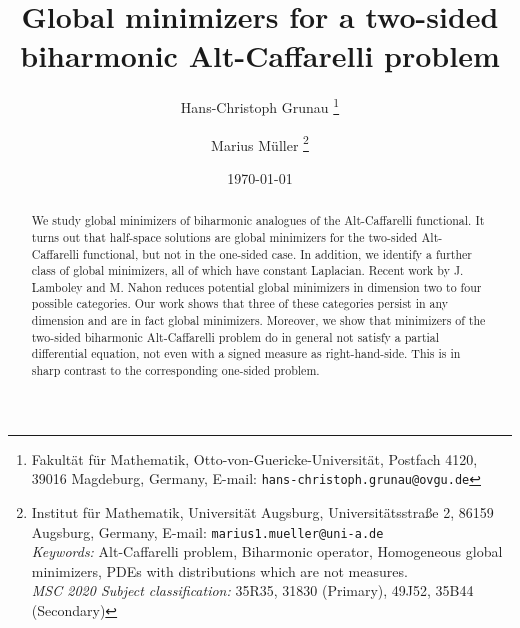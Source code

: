 \documentclass[twoside,11pt]{article}
\title{
Global minimizers for  a two-sided biharmonic 
Alt-Caffarelli 
problem
}
\author{Hans-Christoph Grunau
\thanks{Fakult\"{a}t f\"{u}r Mathematik, 
Otto-von-Guericke-Universit\"{a}t,
Postfach 4120,
39016 Magdeburg, Germany,
E-mail: \texttt{hans-christoph.grunau@ovgu.de}}
\and 
Marius M\"uller
\thanks{Institut f\"ur Mathematik, Universit\"at Augsburg,
	Universit\"atsstra{\ss}e 2,
	86159 Augsburg, Germany,
E-mail: \texttt{marius1.mueller@uni-a.de}
 \\
 \emph{Keywords:} 
Alt-Caffarelli problem, Biharmonic operator, Homogeneous global minimizers, PDEs with distributions which are not measures. 
 \\
 \emph{MSC 2020 Subject classification:} 35R35, 31830 (Primary), 49J52, 35B44 (Secondary)
 }%
}
\date{\today}
\theoremstyle{definition}
\begin{document}
\maketitle

\begin{abstract}
    We study global minimizers of biharmonic analogues of the Alt-Caffarelli functional. It turns out that half-space solutions are global minimizers for the two-sided Alt-Caffarelli functional, but not in the one-sided case. In addition, we identify a further class of global minimizers, all of which have constant Laplacian. Recent work by J. Lamboley and M. Nahon reduces potential global minimizers in dimension two to four possible categories.
    Our work shows that three of these categories persist in any dimension and are in fact global minimizers. 
\newline   
Moreover, we show that minimizers of the two-sided biharmonic Alt-Caffarelli problem do in general not satisfy a partial differential equation, not even with a signed measure as right-hand-side. This is in sharp contrast to the corresponding one-sided problem.
\end{abstract}

\end{document}
